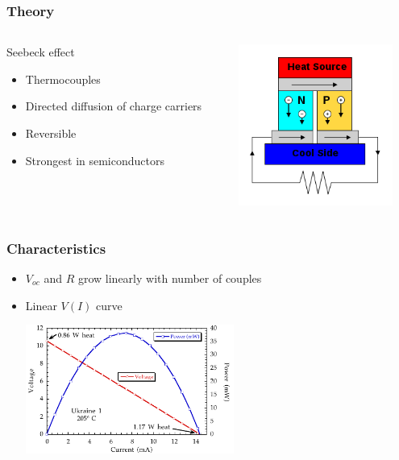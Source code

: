 \documentclass{beamer}
\begin{document}
\begin{frame}
  \frametitle{Theory}
\begin{columns}
  
\begin{column}{.5\textwidth}
\begin{block}{Seebeck effect}
  \begin{itemize}
    \item Thermocouples
    \item Directed diffusion of charge carriers
    \item Reversible
    \item Strongest in semiconductors
  \end{itemize}
\end{block}
\end{column}

\begin{column}{.5\textwidth}
\begin{block}{}
\includegraphics[height=150pt]{./Slike/TEG-couple}
\end{block}
\end{column}
\end{columns}
\end{frame}

\begin{frame}
  \frametitle{Characteristics}
\begin{itemize}
  \item $V_{oc}$ and $R$ grow linearly with number of couples
  \item Linear $V(I)$ curve

\begin{center}
  \includegraphics[height=120pt]{./Slike/TEG-curve}
\end{center}
 
\end{itemize}

\end{frame}
\end{document}
